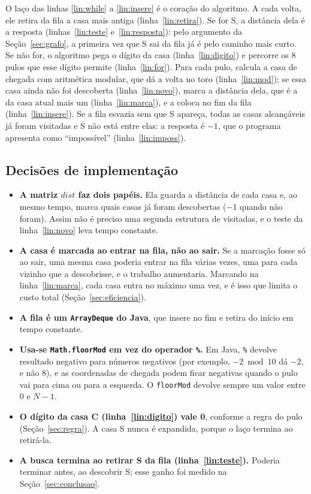 O laço das linhas \ref{lin:while} a \ref{lin:insere} é o coração do algoritmo. A cada volta,
ele retira da fila a casa mais antiga (linha~\ref{lin:retira}). Se for S, a distância dela é a
resposta (linhas~\ref{lin:teste} e~\ref{lin:resposta}): pelo argumento da
Seção~\ref{sec:grafo}, a primeira vez que S sai da fila já é pelo caminho mais curto. Se não
for, o algoritmo pega o dígito da casa (linha~\ref{lin:digito}) e percorre os 8 pulos que esse
dígito permite (linha~\ref{lin:for}). Para cada pulo, calcula a casa de chegada com aritmética
modular, que dá a volta no toro (linha~\ref{lin:mod}); se essa casa ainda não foi descoberta
(linha~\ref{lin:novo}), marca a distância dela, que é a da casa atual mais um
(linha~\ref{lin:marca}), e a coloca no fim da fila (linha~\ref{lin:insere}). Se a fila esvazia
sem que S apareça, todas as casas alcançáveis já foram visitadas e S não está entre elas:
a resposta é $-1$, que o programa apresenta como ``impossível'' (linha~\ref{lin:imposs}).

\subsection{Decisões de implementação}
\label{sec:decisoes}

\begin{itemize}
  \item \textbf{A matriz $dist$ faz dois papéis.} Ela guarda a distância de cada casa e, ao
    mesmo tempo, marca quais casas já foram descobertas ($-1$ quando não foram). Assim não
    é preciso uma segunda estrutura de visitadas, e o teste da linha~\ref{lin:novo} leva
    tempo constante.
  \item \textbf{A casa é marcada ao entrar na fila, não ao sair.} Se a marcação fosse só ao sair,
    uma mesma casa poderia entrar na fila várias vezes, uma para cada vizinho que a descobrisse,
    e o trabalho aumentaria. Marcando na linha~\ref{lin:marca}, cada casa entra no máximo uma
    vez, e é isso que limita o custo total (Seção~\ref{sec:eficiencia}).
  \item \textbf{A fila é um \texttt{ArrayDeque} do Java}, que insere no fim e retira do início
    em tempo constante.
  \item \textbf{Usa-se \texttt{Math.floorMod} em vez do operador \texttt{\%}.} Em Java,
    \texttt{\%} devolve resultado negativo para números negativos (por exemplo,
    $-2 \bmod 10$ dá $-2$, e não 8), e as coordenadas de chegada podem ficar negativas quando
    o pulo vai para cima ou para a esquerda. O \texttt{floorMod} devolve sempre um valor entre
    0 e $N - 1$.
  \item \textbf{O dígito da casa C (linha~\ref{lin:digito}) vale 0}, conforme a regra do pulo
    (Seção~\ref{sec:regra}). A casa S nunca é expandida, porque o laço termina ao retirá-la.
  \item \textbf{A busca termina ao retirar S da fila (linha~\ref{lin:teste}).} Poderia terminar
    antes, ao descobrir S; esse ganho foi medido na Seção~\ref{sec:conclusao}.
\end{itemize}

